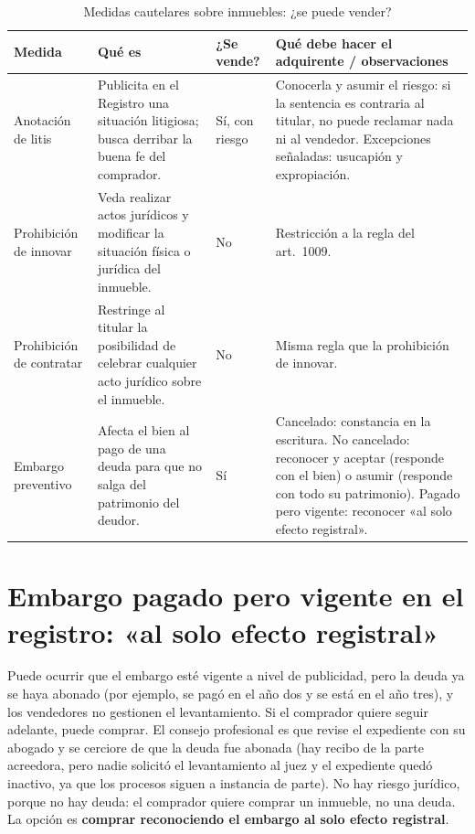 \documentclass[12pt,oneside]{book}
\begin{document}
\begin{table}[H]
\centering
\caption{Medidas cautelares sobre inmuebles: ¿se puede vender?}
\small
\begin{tabularx}{\textwidth}{>{\raggedright\arraybackslash}p{2.3cm}>{\raggedright\arraybackslash}X>{\raggedright\arraybackslash}p{1.8cm}>{\raggedright\arraybackslash}X}
\toprule
\textbf{Medida} & \textbf{Qué es} & \textbf{¿Se vende?} & \textbf{Qué debe hacer el adquirente / observaciones} \\
\midrule
Anotación de litis & Publicita en el Registro una situación litigiosa; busca derribar la buena fe del comprador. & Sí, con riesgo & Conocerla y asumir el riesgo: si la sentencia es contraria al titular, no puede reclamar nada ni al vendedor. Excepciones señaladas: usucapión y expropiación. \\
Prohibición de innovar & Veda realizar actos jurídicos y modificar la situación física o jurídica del inmueble. & No & Restricción a la regla del art.\ 1009. \\
Prohibición de contratar & Restringe al titular la posibilidad de celebrar cualquier acto jurídico sobre el inmueble. & No & Misma regla que la prohibición de innovar. \\
Embargo preventivo & Afecta el bien al pago de una deuda para que no salga del patrimonio del deudor. & Sí & Cancelado: constancia en la escritura. No cancelado: reconocer y aceptar (responde con el bien) o asumir (responde con todo su patrimonio). Pagado pero vigente: reconocer «al solo efecto registral». \\
\bottomrule
\end{tabularx}
\end{table}

\section{Embargo pagado pero vigente en el registro: «al solo efecto registral»}

Puede ocurrir que el embargo esté vigente a nivel de publicidad, pero la deuda ya se haya abonado (por ejemplo, se pagó en el año dos y se está en el año tres), y los vendedores no gestionen el levantamiento. Si el comprador quiere seguir adelante, puede comprar. El consejo profesional es que revise el expediente con su abogado y se cerciore de que la deuda fue abonada (hay recibo de la parte acreedora, pero nadie solicitó el levantamiento al juez y el expediente quedó inactivo, ya que los procesos siguen a instancia de parte). No hay riesgo jurídico, porque no hay deuda: el comprador quiere comprar un inmueble, no una deuda. La opción es \textbf{comprar reconociendo el embargo al solo efecto registral}.
\end{document}
